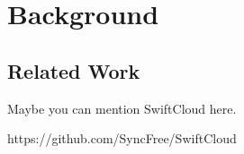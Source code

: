 \chapter{Background}
\label{Background}


\section{Related Work}

Maybe you can mention SwiftCloud here.

https://github.com/SyncFree/SwiftCloud

